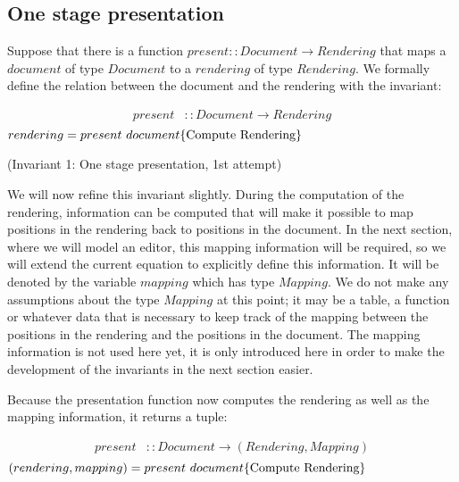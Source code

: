 \subsection{One stage presentation}


Suppose that there is a function $present :: Document \rightarrow Rendering$ that maps a $document$ of type $Document$ to a $rendering$ of type $Rendering$. We formally define the relation between the document and the rendering with the invariant:\begin{small}\begin{align*} %
present & :: Document \rightarrow Rendering \\
\end{align*}
\begin{math}
rendering = present~document
\hfill \text{\{Compute Rendering\}}
\end{math}\end{small}

{\centering (Invariant 1: One stage presentation, 1st attempt)\\}\vspace{1em}

We will now refine this invariant slightly. During the computation of the rendering, information can be computed that will make it possible to map positions in the rendering back to positions in the document. In the next section, where we will model an editor, this mapping information will be required, so we will extend the current equation to explicitly define this information. It will be denoted by the variable $mapping$ which has type $Mapping$. We do not make any assumptions about the type $Mapping$ at this point; it may be a table, a function or whatever data that is necessary to keep track of the mapping between the positions in the rendering and the positions in the document. The mapping information is not used here yet, it is only introduced here in order to make the development of the invariants in the next section easier. 

Because the presentation function now computes the rendering as well as the mapping information, it returns a tuple:\begin{small}\begin{align*} %
present & :: Document \rightarrow (Rendering, Mapping) \\
\end{align*}
\begin{math}
(rendering, mapping) = present~document
\hfill \text{\{Compute Rendering\}}
\end{math}\end{small}


